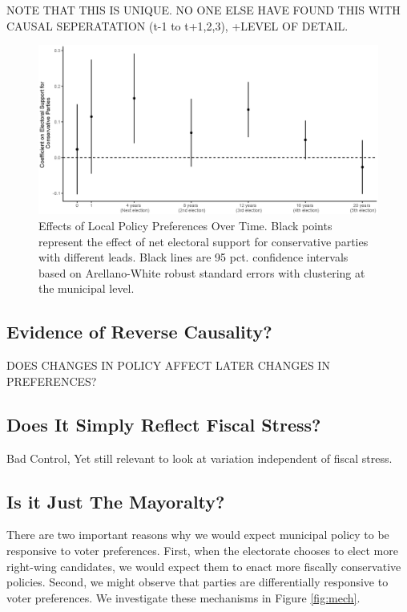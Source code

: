 \documentclass[a4paper,12pt]{article}
\begin{document}
NOTE THAT THIS IS UNIQUE. NO ONE ELSE HAVE FOUND THIS WITH CAUSAL SEPERATATION (t-1 to t+1,2,3), +LEVEL OF DETAIL.

\begin{figure}[h]
	\centering
	\includegraphics[scale = .6]{NoLag_varying_leads.eps}
	\caption{Effects of Local Policy Preferences Over Time. Black points represent the effect of net electoral support for conservative parties with different leads. Black lines are 95 pct. confidence intervals based on Arellano-White robust standard errors with clustering at the municipal level.}
	\label{fig:LongRun}
\end{figure}


\subsection*{Evidence of Reverse Causality?}
DOES CHANGES IN POLICY AFFECT LATER CHANGES IN PREFERENCES?


\subsection*{Does It Simply Reflect Fiscal Stress?}
Bad Control, Yet still relevant to look at variation independent of fiscal stress. 

\subsection*{Is it Just The Mayoralty?}

There are two important reasons why we would expect municipal policy to be responsive to voter preferences. First, when the electorate chooses to elect more right-wing candidates, we would expect them to enact more fiscally conservative policies. Second, we might observe that parties are differentially responsive to voter preferences. We investigate these mechanisms in Figure \ref{fig:mech}.
\end{document}
